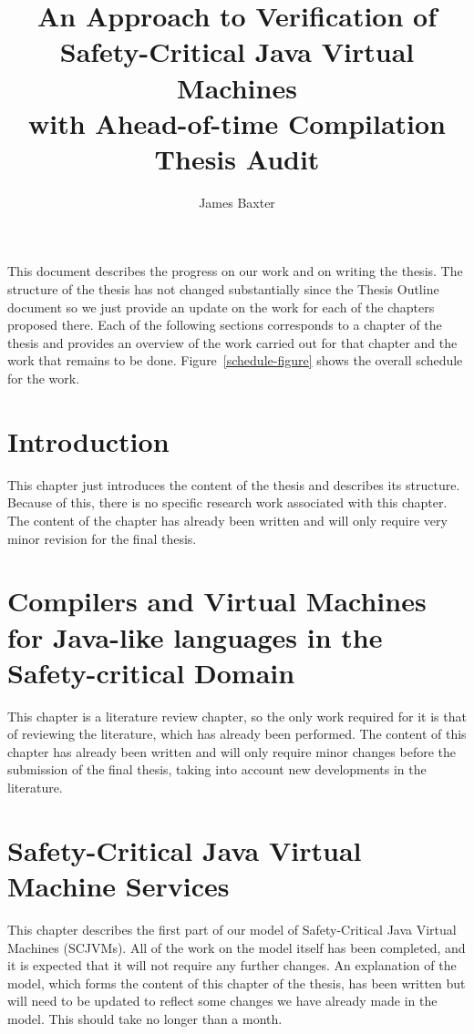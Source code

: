 \documentclass[a4paper,12pt]{article}
\title{An Approach to Verification of \\
  Safety-Critical Java Virtual Machines \\
  with Ahead-of-time Compilation
  \\[0.8cm]
  \Large Thesis Audit} \author{James Baxter}
\begin{document}
\maketitle

This document describes the progress on our work and on writing the
thesis. 
The structure of the thesis has not changed substantially since the
Thesis Outline document so we just provide an update on the work for
each of the chapters proposed there. 
Each of the following sections corresponds to a chapter of the thesis
and provides an overview of the work carried out for that chapter and
the work that remains to be done. 
Figure~\ref{schedule-figure} shows the overall schedule for the work.

\section{Introduction}

This chapter just introduces the content of the thesis and describes
its structure. 
Because of this, there is no specific research work associated with
this chapter. 
The content of the chapter has already been written and will only
require very minor revision for the final thesis.

\section{Compilers and Virtual Machines for Java-like languages in the
  Safety-critical Domain}

This chapter is a literature review chapter, so the only work required
for it is that of reviewing the literature, which has already been
performed.
The content of this chapter has already been written and will only
require minor changes before the submission of the final thesis,
taking into account new developments in the literature.

\section{Safety-Critical Java Virtual Machine Services}

This chapter describes the first part of our model of Safety-Critical
Java Virtual Machines (SCJVMs). 
All of the work on the model itself has been completed, and it is
expected that it will not require any further changes.
An explanation of the model, which forms the content of this chapter
of the thesis, has been written but will need to be updated to reflect
some changes we have already made in the model.
This should take no longer than a month.
\end{document}
